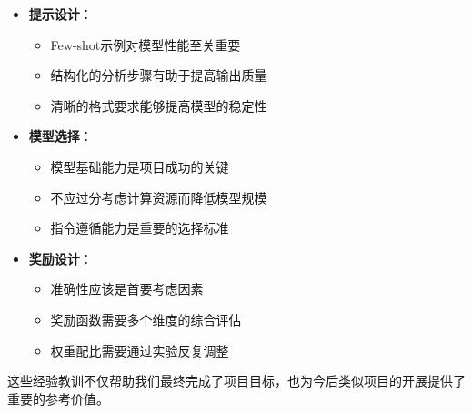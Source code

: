 \documentclass[a4paper, 12pt]{article}
\begin{document}
\begin{itemize}
    \item \textbf{提示设计}：
        \begin{itemize}
            \item Few-shot示例对模型性能至关重要
            \item 结构化的分析步骤有助于提高输出质量
            \item 清晰的格式要求能够提高模型的稳定性
        \end{itemize}
    
    \item \textbf{模型选择}：
        \begin{itemize}
            \item 模型基础能力是项目成功的关键
            \item 不应过分考虑计算资源而降低模型规模
            \item 指令遵循能力是重要的选择标准
        \end{itemize}
    
    \item \textbf{奖励设计}：
        \begin{itemize}
            \item 准确性应该是首要考虑因素
            \item 奖励函数需要多个维度的综合评估
            \item 权重配比需要通过实验反复调整
        \end{itemize}
\end{itemize}

这些经验教训不仅帮助我们最终完成了项目目标，也为今后类似项目的开展提供了重要的参考价值。



\end{document}
